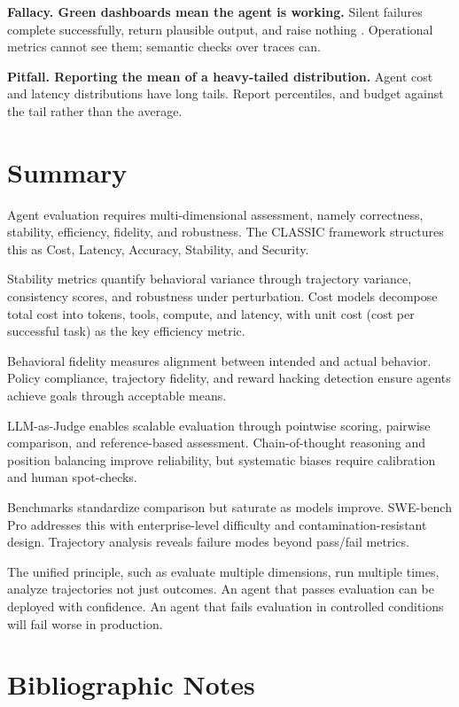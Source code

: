\textbf{Fallacy. Green dashboards mean the agent is working.} Silent failures
complete successfully, return plausible output, and raise nothing
\cite{silentfail2026}. Operational metrics cannot see them; semantic checks over
traces can.

\textbf{Pitfall. Reporting the mean of a heavy-tailed distribution.} Agent cost
and latency distributions have long tails. Report percentiles, and budget against
the tail rather than the average.

\section{Summary}

Agent evaluation requires multi-dimensional assessment, namely correctness, stability, efficiency, fidelity, and robustness. The CLASSIC framework structures this as Cost, Latency, Accuracy, Stability, and Security.

Stability metrics quantify behavioral variance through trajectory variance, consistency scores, and robustness under perturbation. Cost models decompose total cost into tokens, tools, compute, and latency, with unit cost (cost per successful task) as the key efficiency metric.

Behavioral fidelity measures alignment between intended and actual behavior. Policy compliance, trajectory fidelity, and reward hacking detection ensure agents achieve goals through acceptable means.

LLM-as-Judge enables scalable evaluation through pointwise scoring, pairwise comparison, and reference-based assessment. Chain-of-thought reasoning and position balancing improve reliability, but systematic biases require calibration and human spot-checks.

Benchmarks standardize comparison but saturate as models improve. SWE-bench Pro addresses this with enterprise-level difficulty and contamination-resistant design. Trajectory analysis reveals failure modes beyond pass/fail metrics.

The unified principle, such as evaluate multiple dimensions, run multiple times, analyze trajectories not just outcomes. An agent that passes evaluation can be deployed with confidence. An agent that fails evaluation in controlled conditions will fail worse in production.

\section*{Bibliographic Notes}

